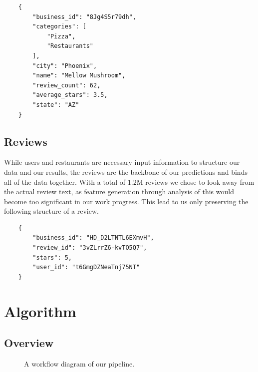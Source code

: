 \documentclass[10pt,twocolumn,letterpaper]{article}
\begin{document}
\begin{verbatim}
	{
	    "business_id": "8Jg4S5r79dh",
	    "categories": [
	        "Pizza",
	        "Restaurants"
	    ],
	    "city": "Phoenix",
	    "name": "Mellow Mushroom",
	    "review_count": 62,
	    "average_stars": 3.5,
	    "state": "AZ"
	}
\end{verbatim}

\subsection{Reviews}
While users and restaurants are necessary input information to structure our data and our results, the reviews are the backbone of our predictions and binds all of the data together. With a total of 1.2M reviews we chose to look away from the actual review text, as feature generation through analysis of this would become too significant in our work progress. This lead to us only preserving the following structure of a review.

\begin{verbatim}
	{
	    "business_id": "HD_D2LTNTL6EXmvH",
	    "review_id": "3vZLrrZ6-kvTO5Q7",
	    "stars": 5,
	    "user_id": "t6GmgDZNeaTnj75NT"
	}
\end{verbatim}


\section{Algorithm}

\subsection{Overview}
\begin{figure}[t]
\begin{center}
\end{center}
   \caption{A workflow diagram of our pipeline.}
\label{fig:long}
\label{fig:onecol}
\end{figure}
\end{document}
